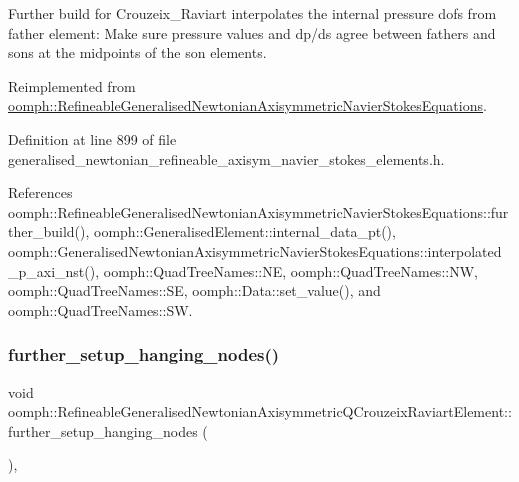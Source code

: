 Further build for Crouzeix\+\_\+\+Raviart interpolates the internal pressure dofs from father element\+: Make sure pressure values and dp/ds agree between fathers and sons at the midpoints of the son elements. 

Reimplemented from \hyperlink{classoomph_1_1RefineableGeneralisedNewtonianAxisymmetricNavierStokesEquations_af800c46aa82a7188565d68df5aee6fa0}{oomph\+::\+Refineable\+Generalised\+Newtonian\+Axisymmetric\+Navier\+Stokes\+Equations}.



Definition at line 899 of file generalised\+\_\+newtonian\+\_\+refineable\+\_\+axisym\+\_\+navier\+\_\+stokes\+\_\+elements.\+h.



References oomph\+::\+Refineable\+Generalised\+Newtonian\+Axisymmetric\+Navier\+Stokes\+Equations\+::further\+\_\+build(), oomph\+::\+Generalised\+Element\+::internal\+\_\+data\+\_\+pt(), oomph\+::\+Generalised\+Newtonian\+Axisymmetric\+Navier\+Stokes\+Equations\+::interpolated\+\_\+p\+\_\+axi\+\_\+nst(), oomph\+::\+Quad\+Tree\+Names\+::\+NE, oomph\+::\+Quad\+Tree\+Names\+::\+NW, oomph\+::\+Quad\+Tree\+Names\+::\+SE, oomph\+::\+Data\+::set\+\_\+value(), and oomph\+::\+Quad\+Tree\+Names\+::\+SW.

\mbox{\label{classoomph_1_1RefineableGeneralisedNewtonianAxisymmetricQCrouzeixRaviartElement_abb293aeb834d1edf4d9f9e0150259e55}} 
\subsubsection{\texorpdfstring{further\+\_\+setup\+\_\+hanging\+\_\+nodes()}{further\_setup\_hanging\_nodes()}}
{\footnotesize\ttfamily void oomph\+::\+Refineable\+Generalised\+Newtonian\+Axisymmetric\+Q\+Crouzeix\+Raviart\+Element\+::further\+\_\+setup\+\_\+hanging\+\_\+nodes (\begin{DoxyParamCaption}{ }\end{DoxyParamCaption})\hspace{0.3cm}{\ttfamily [inline]}, {\ttfamily [virtual]}}



